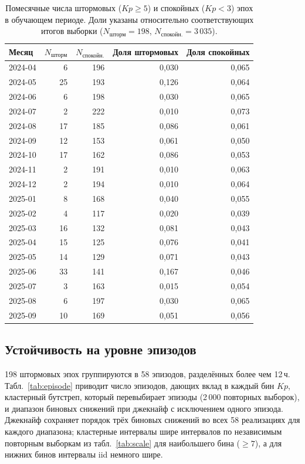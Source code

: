 \documentclass{agujournal2019}
\begin{document}
\begin{table}[h]
	\centering
	\small
	\caption{Помесячные числа штормовых ($Kp \ge 5$) и спокойных
		($Kp < 3$) эпох в обучающем периоде. Доли указаны относительно
		соответствующих итогов выборки ($N_{\mbox{шторм}} = 198$,
		$N_{\mbox{спокойн.}} = 3\,035$).}
	\label{tab:balance_month}
	\begin{tabular}{lrrrr}
		\toprule
		Месяц & $N_{\mbox{шторм}}$ & $N_{\mbox{спокойн.}}$
		& Доля штормовых & Доля спокойных \\
		\midrule
		2024-04 & 6  & 196 & 0,030 & 0,065 \\
		2024-05 & 25 & 193 & 0,126 & 0,064 \\
		2024-06 & 6  & 198 & 0,030 & 0,065 \\
		2024-07 & 2  & 222 & 0,010 & 0,073 \\
		2024-08 & 17 & 185 & 0,086 & 0,061 \\
		2024-09 & 12 & 153 & 0,061 & 0,050 \\
		2024-10 & 17 & 162 & 0,086 & 0,053 \\
		2024-11 & 2  & 191 & 0,010 & 0,063 \\
		2024-12 & 2  & 194 & 0,010 & 0,064 \\
		2025-01 & 8  & 168 & 0,040 & 0,055 \\
		2025-02 & 4  & 117 & 0,020 & 0,039 \\
		2025-03 & 16 & 132 & 0,081 & 0,043 \\
		2025-04 & 15 & 125 & 0,076 & 0,041 \\
		2025-05 & 14 & 129 & 0,071 & 0,043 \\
		2025-06 & 33 & 141 & 0,167 & 0,046 \\
		2025-07 & 3  & 163 & 0,015 & 0,054 \\
		2025-08 & 6  & 197 & 0,030 & 0,065 \\
		2025-09 & 10 & 169 & 0,051 & 0,056 \\
		\bottomrule
	\end{tabular}
\end{table}

\subsection{Устойчивость на уровне эпизодов}

198 штормовых эпох группируются в 58 эпизодов, разделённых более чем 12\,ч.
Табл.~\ref{tab:episode} приводит число эпизодов, дающих вклад в каждый бин
$Kp$, кластерный бутстреп, который перевыбирает эпизоды (2\,000 повторных выборок),
и диапазон биновых снижений при джекнайф с исключением одного эпизода.
Джекнайф сохраняет порядок трёх биновых снижений во всех 58 реализациях
для каждого диапазона; кластерные интервалы шире интервалов по независимым
повторным выборкам из табл.~\ref{tab:scale} для наибольшего бина ($\ge 7$),
а для нижних бинов интервалы iid немного шире.
\end{document}
